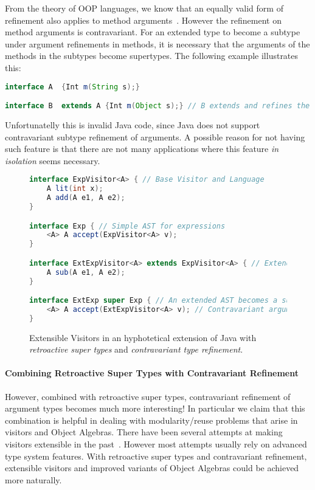 \noindent From the theory of OOP languages, we know that an equally
valid form of refinement also applies to method arguments~\cite{}. However 
the refinement on method arguments is contravariant. For an
extended type to become a subtype under argument refinements in
methods, it is necessary that the arguments of the methods
in the subtypes become supertypes. The following example illustrates 
this: 

\begin{lstlisting}[language=java]
interface A  {Int m(String s);} 

interface B  extends A {Int m(Object s);} // B extends and refines the return type of m()
\end{lstlisting}

\noindent Unfortunatelly this is invalid Java code, since Java 
does not support contravariant subtype refinement of arguments. 
A possible reason for not having such feature is that there are not
many applications where this feature \emph{in isolation} seems necessary. 

\begin{figure}
\begin{lstlisting}[language=java]
interface ExpVisitor<A> { // Base Visitor and Language
	A lit(int x);
	A add(A e1, A e2);
}

interface Exp { // Simple AST for expressions
	<A> A accept(ExpVisitor<A> v);
}

interface ExtExpVisitor<A> extends ExpVisitor<A> { // Extended Visitor and Language
	A sub(A e1, A e2);
}

interface ExtExp super Exp { // An extended AST becomes a supertype of the original one
	<A> A accept(ExtExpVisitor<A> v); // Contravariant argument refinement
}
\end{lstlisting}
\caption{Extensible Visitors in an hyphotetical
  extension of Java with \emph{retroactive super types} and \emph{contravariant
  type refinement}.}
\label{fig:JVis}
\end{figure}

\paragraph{Combining Retroactive Super Types with Contravariant Refinement}
However, combined with retroactive super types, contravariant
refinement of argument types becomes 
much more interesting! In particular we claim that this combination is 
helpful in dealing with modularity/reuse problems that arise in
visitors and Object Algebras. There have been several attempts 
at making visitors extensible in the past~\cite{}. However most
attempts usually rely on advanced type system features. With retroactive super
types and contravariant refinement, extensible visitors and improved
variants of Object Algebras could be achieved more naturally.  

